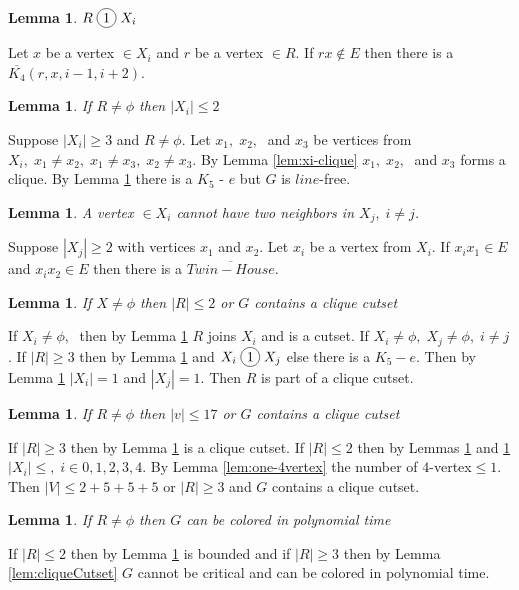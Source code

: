 \documentclass[12pt]{article}
\newcommand*\circled[1]{\tikz[baseline=(char.base)]{
            \node[shape=circle,draw,inner sep=2pt] (char) {#1};}}
\newtheorem{Lemma}[Theorem]{Lemma}
\begin{document}
\begin{Lemma}\label{lem:r-join-xi}
$R \; \circled{1} \; X_i$
\end{Lemma}
 Let $x$ be a vertex $\in X_i$ and $r$ be a vertex $\in R$. If $rx \not \in E$ then there is a $\overline{K_4} (r, x, i-1, i+2)$.

\begin{Lemma}\label{lem:r-limits-xi}
If $R \neq \phi$ then $|X_i| \leq 2$
\end{Lemma}
 Suppose $|X_i| \geq 3$ and $R \neq \phi$. Let $x_1,\; x_2,\;$ and $x_3$ be vertices from $X_i,\; x_1 \neq x_2,\; x_1 \neq x_3,\; x_2 \neq x_3$. By Lemma \ref{lem:xi-clique} $x_1,\; x_2,\;$ and $x_3$ forms a clique. By Lemma \ref{lem:r-join-xi} there is a $K_5$ - $e$ but $G$ is $line$-free.

\begin{Lemma}\label{lem:2xi-cojoins-xj}
A vertex $\in X_i$ cannot have two neighbors in $X_j,\; i \neq j$.
\end{Lemma}
 Suppose $|X_j| \geq 2$ with vertices $x_1$ and $x_2$. Let $x_i$ be a vertex from $X_{i}$. If $x_ix_1 \in E$ and $x_ix_2 \in E$ then there is a $\overline{Twin-House}$.

\begin{Lemma}\label{lem:xi-limits-r}
If $X \neq \phi$ then $|R| \leq 2$ or $G$ contains a clique cutset 
\end{Lemma}
 If $X_i \neq \phi,\;$ then by Lemma \ref{lem:r-join-xi} $R$ joins $X_i$ and is a cutset. If $X_i \neq \phi,\; X_j \neq \phi,\; i \neq j$. If $|R| \geq 3$ then by Lemma \ref{lem:r-join-xi} and $X_i \; \circled{1} \; X_j$ else there is a $K_5 - e$. Then by Lemma \ref{lem:2xi-cojoins-xj} $|X_i| = 1$ and $|X_j| = 1$. Then $R$ is part of a clique cutset.

\begin{Lemma}\label{lem:r-bounded}
If $R \neq \phi$ then $ |v| \leq 17$ or $G$ contains a clique cutset
\end{Lemma}
 If $|R| \geq 3$ then by Lemma \ref{lem:xi-limits-r} is a clique cutset. If $|R| \leq 2$ then by Lemmas \ref{lem:r-limits-xi} and \ref{lem:2xi-cojoins-xj} $|X_i| \leq,\; i \in {0,1,2,3,4}$. By Lemma \ref{lem:one-4vertex} the number of $4$-vertex$ \leq 1$. Then $|V| \leq 2 + 5 + 5 + 5$ or $|R| \geq 3$ and $G$ contains a clique cutset.

\begin{Lemma}\label{lem:r-polynomial}
If $R \neq \phi$ then $G$ can be colored in polynomial time
\end{Lemma}
 If $|R| \leq 2$ then by Lemma \ref{lem:r-bounded} is bounded and if $|R| \geq 3$ then by Lemma \ref{lem:cliqueCutset} $G$ cannot be critical and can be colored in polynomial time.
\end{document}
